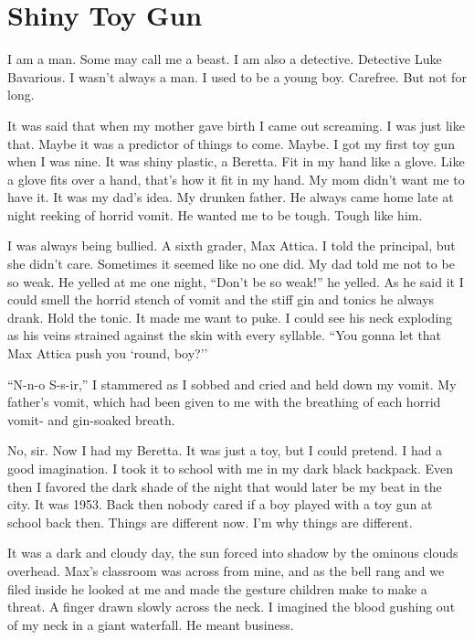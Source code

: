 \chapter{Shiny Toy Gun}


I am a man. Some may call me a beast. I am also a detective.
Detective Luke Bavarious. I wasn't always a man. I used to be
a young boy. Carefree. But not for long.



It was said that when my mother gave birth I came out screaming. I
was just like that. Maybe it was a predictor of things to come.
Maybe. I got my first toy gun when I was nine. It was shiny
plastic, a Beretta. Fit in my hand like a glove. Like a glove fits
over a hand, that's how it fit in my hand. My mom
didn't want me to have it. It was my dad's idea. My
drunken father. He always came home late at night reeking of horrid
vomit. He wanted me to be tough. Tough like him.



I was always being bullied. A sixth grader, Max Attica. I told the
principal, but she didn't care. Sometimes it seemed like no
one did. My dad told me not to be so weak. He yelled at me one
night, ``Don't be so weak!'' he yelled. As he said
it I could smell the horrid stench of vomit and the stiff gin and
tonics he always drank. Hold the tonic. It made me want to puke. I
could see his neck exploding as his veins strained against the skin
with every syllable. ``You gonna let that Max Attica push you
`round, boy?''



``N-n-o S-s-ir,'' I stammered as I sobbed and cried and
held down my vomit. My father's vomit, which had been given
to me with the breathing of each horrid vomit- and gin-soaked
breath.



No, sir. Now I had my Beretta. It was just a toy, but I could
pretend. I had a good imagination. I took it to school with me in
my dark black backpack. Even then I favored the dark shade of the
night that would later be my beat in the city. It was 1953. Back
then nobody cared if a boy played with a toy gun at school back
then. Things are different now. I'm why things are
different.



It was a dark and cloudy day, the sun forced into shadow by the
ominous clouds overhead. Max's classroom was across from
mine, and as the bell rang and we filed inside he looked at me and
made the gesture children make to make a threat. A finger drawn
slowly across the neck. I imagined the blood gushing out of my neck
in a giant waterfall. He meant business.



